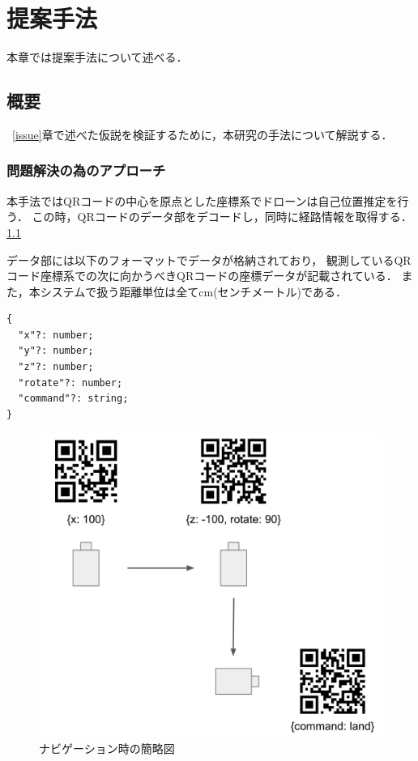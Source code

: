 \chapter{提案手法}
\label{proposed}

本章では提案手法について述べる．

\section{概要}
~\ref{issue}章で述べた仮説を検証するために，本研究の手法について解説する．

\subsection{問題解決の為のアプローチ}
本手法ではQRコードの中心を原点とした座標系でドローンは自己位置推定を行う．
この時，QRコードのデータ部をデコードし，同時に経路情報を取得する．\ref{flow_sample}

データ部には以下のフォーマットでデータが格納されており，
観測しているQRコード座標系での次に向かうべきQRコードの座標データが記載されている．
また，本システムで扱う距離単位は全てcm(センチメートル)である．
\begin{lstlisting}[caption=data format,label=data_format]
{
  "x"?: number;
  "y"?: number;
  "z"?: number;
  "rotate"?: number;
  "command"?: string;
}
\end{lstlisting}
\begin{figure}[htbp]
  \begin{center}
    \includegraphics[clip,width=15.0cm]{img/flow.png}
    \caption{ナビゲーション時の簡略図}
    \label{flow_sample}
  \end{center}
\end{figure}



